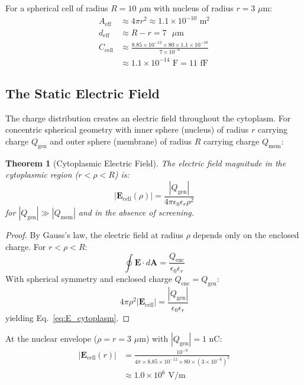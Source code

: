 \documentclass[twocolumn,10pt,aps,prd,superscriptaddress,floatfix,nofootinbib]{revtex4-2}
\newtheorem{theorem}{Theorem}[section]
\theoremstyle{remark}
\newcommand{\Ecell}{\mathbf{E}_{\mathrm{cell}}}
\newcommand{\Qgen}{Q_{\mathrm{gen}}}
\newcommand{\Qmem}{Q_{\mathrm{mem}}}
\begin{document}
For a spherical cell of radius $R = 10$ $\mu$m with nucleus of radius $r = 3$ $\mu$m:
\begin{align}
A_{\mathrm{eff}} &\approx 4\pi r^2 \approx 1.1 \times 10^{-10} \text{ m}^2 \\
d_{\mathrm{eff}} &\approx R - r = 7 \text{ $\mu$m} \\
C_{\mathrm{cell}} &\approx \frac{8.85 \times 10^{-12} \times 80 \times 1.1 \times 10^{-10}}{7 \times 10^{-6}} \nonumber \\
&\approx 1.1 \times 10^{-14} \text{ F} = 11 \text{ fF}
\end{align}

\subsection{The Static Electric Field}

The charge distribution creates an electric field throughout the cytoplasm. For concentric spherical geometry with inner sphere (nucleus) of radius $r$ carrying charge $\Qgen$ and outer sphere (membrane) of radius $R$ carrying charge $\Qmem$:

\begin{theorem}[Cytoplasmic Electric Field]
\label{thm:E_field}
The electric field magnitude in the cytoplasmic region ($r < \rho < R$) is:
\begin{equation}
|\Ecell(\rho)| = \frac{|\Qgen|}{4\pi\epsilon_0\epsilon_r\rho^2}
\label{eq:E_cytoplasm}
\end{equation}
for $|\Qgen| \gg |\Qmem|$ and in the absence of screening.
\end{theorem}

\begin{proof}
By Gauss's law, the electric field at radius $\rho$ depends only on the enclosed charge. For $r < \rho < R$:
\begin{equation}
\oint \mathbf{E} \cdot d\mathbf{A} = \frac{Q_{\mathrm{enc}}}{\epsilon_0\epsilon_r}
\end{equation}
With spherical symmetry and enclosed charge $Q_{\mathrm{enc}} = \Qgen$:
\begin{equation}
4\pi\rho^2 |\Ecell| = \frac{|\Qgen|}{\epsilon_0\epsilon_r}
\end{equation}
yielding Eq.~\eqref{eq:E_cytoplasm}.
\end{proof}

At the nuclear envelope ($\rho = r = 3$ $\mu$m) with $|\Qgen| = 1$ nC:
\begin{align}
|\Ecell(r)| &= \frac{10^{-9}}{4\pi \times 8.85 \times 10^{-12} \times 80 \times (3 \times 10^{-6})^2} \nonumber \\
&\approx 1.0 \times 10^{6} \text{ V/m}
\end{align}
\end{document}
